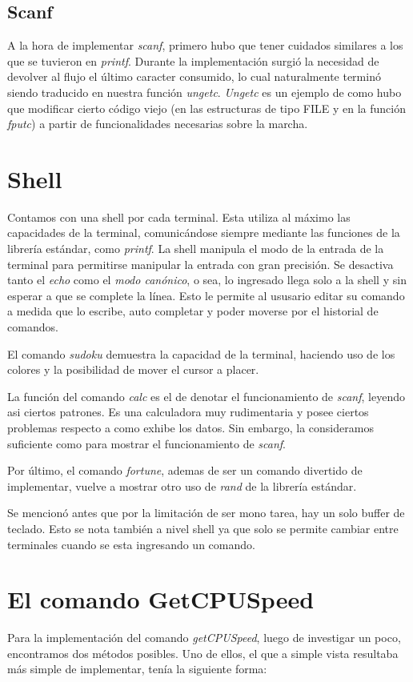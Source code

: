 \documentclass[a4paper,10pt]{article}
\begin{document}
    \subsection{Scanf}    
        A la hora de implementar \textit{scanf}, primero hubo que tener cuidados similares a los que se tuvieron en \textit{printf}. Durante la implementación surgió la necesidad de devolver al flujo el último caracter consumido, lo cual naturalmente terminó siendo traducido en nuestra función \textit{ungetc}. \textit{Ungetc} es un ejemplo de como hubo que modificar cierto código viejo (en las estructuras de tipo FILE y en la función \textit{fputc}) a partir de funcionalidades necesarias sobre la marcha.
\newpage
\section{Shell}
    Contamos con una shell por cada terminal.
    Esta utiliza al máximo las capacidades de la terminal, comunicándose siempre mediante las funciones de la librería estándar, como \textit{printf}.
    La shell manipula el modo de la entrada de la terminal para permitirse manipular la entrada con gran precisión.
    Se desactiva tanto el \textit{echo} como el \textit{modo canónico}, o sea, lo ingresado llega solo a la shell y sin esperar a que se complete la línea.
    Esto le permite al ususario editar su comando a medida que lo escribe, auto completar y poder moverse por el historial de comandos.

    El comando \textit{sudoku} demuestra la capacidad de la terminal, haciendo uso de los colores y la posibilidad de mover el cursor a placer.
    
    La función del comando \textit{calc} es el de denotar el funcionamiento de \textit{scanf}, leyendo asi ciertos patrones.
    Es una calculadora muy rudimentaria y posee ciertos problemas respecto a como exhibe los datos.
    Sin embargo, la consideramos suficiente como para mostrar el funcionamiento de \textit{scanf}.
    
    Por último, el comando \textit{fortune}, ademas de ser un comando divertido de implementar, vuelve a mostrar otro uso de \textit{rand} de la librería estándar.

    Se mencionó antes que por la limitación de ser mono tarea, hay un solo buffer de teclado.
    Esto se nota también a nivel shell ya que solo se permite cambiar entre terminales cuando se esta ingresando un comando.

\newpage
\section{El comando GetCPUSpeed}
    Para la implementación del comando \textit{getCPUSpeed}, luego de investigar un poco, encontramos dos métodos posibles. Uno de ellos, el que a simple vista resultaba
    más simple de implementar, tenía la siguiente forma:
\end{document}
